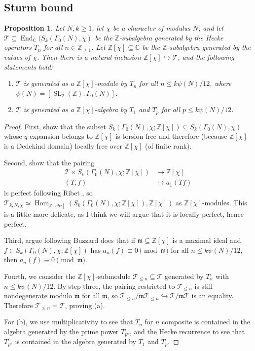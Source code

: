 \documentclass[11pt]{amsart}
\numberwithin{equation}{subsection}
\theoremstyle{plain}
\newtheorem{prop}[equation]{Proposition}
\theoremstyle{definition}
\newcommand{\Z}{\mathbb{Z}}
\newcommand{\C}{\mathbb{C}}
\newcommand{\TT}{\mathcal{T}}
\newcommand{\frakm}{\mathfrak{m}}
\DeclareMathOperator{\End}{End}
\DeclareMathOperator{\SL}{SL}
\DeclareMathOperator{\Hom}{Hom}
\newenvironment{enumalph}
{\begin{enumerate}\renewcommand{\labelenumi}{\textnormal{(\alph{enumi})}}}
{\end{enumerate}}
\begin{document}
\subsection{Sturm bound}

\begin{prop}
Let $N,k \geq 1$, let $\chi$ be a character of modulus $N$, and let $\TT \subseteq \End_\C(S_k(\Gamma_0(N),\chi)$ be the $\Z$-subalgebra generated by the Hecke operators $T_n$ for all $n \in \Z_{\geq 1}$.  Let $\Z[\chi] \subseteq \C$ be the $\Z$-subalgebra generated by the values of $\chi$.  Then there is a natural inclusion $\Z[\chi] \hookrightarrow \TT$, and the following statements hold:
\begin{enumalph}
\item $\TT$ is generated as a $\Z[\chi]$-module by $T_n$ for all $n \leq k\psi(N)/12$, where $\psi(N)=[\SL_2(\Z):\Gamma_0(N)]$.
\item $\TT$ is generated as a $\Z[\chi]$-algebra by $T_1$ and $T_p$ for all $p \leq k\psi(N)/12$.
\end{enumalph}
\end{prop}

\begin{proof}
First, show that the subset $S_k(\Gamma_0(N),\chi;\Z[\chi]) \subseteq S_k(\Gamma_0(N),\chi)$ whose $q$-expansion belongs to $\Z[\chi]$ is torsion free and therefore (because $\Z[\chi]$ is a Dedekind domain) locally free over $\Z[\chi]$ (of finite rank).  

Second, show that the pairing
\begin{equation}
\begin{aligned} 
\TT \times S_k(\Gamma_0(N),\chi;\Z[\chi]) &\to \Z[\chi] \\
(T,f) &\mapsto a_1(Tf)
\end{aligned}
\end{equation}
is perfect following Ribet \cite[Theorem (2.2)]{Ribet:modp}, so $\TT_{k,N,\chi} \simeq \Hom_{\Z[chi]}(S_k(\Gamma_0(N),\chi;\Z[\chi]),\Z[\chi])$ as $\Z[\chi]$-modules.  This is a little more delicate, as I think we will argue that it is locally perfect, hence perfect.  

Third, argue following Buzzard does that if $\frakm \subseteq \Z[\chi]$ is a maximal ideal and $f \in S_k(\Gamma_0(N),\chi;\Z[\chi])$ has $a_n(f) \equiv 0 \pmod{\frakm}$ for all $n \leq k\psi(N)/12$, then $a_n(f) \equiv 0 \pmod{\frakm}$.  

Fourth, we consider the $\Z[\chi]$-submodule $\TT_{\leq n} \subseteq \TT$ generated by $T_n$ with $n \leq k\psi(N)/12$.  By step three, the pairing restricted to $\TT_{\leq n}$ is still nondegenerate modulo $\frakm$ for all $\frakm$, so $\TT_{\leq n}/\frakm \TT_{\leq n} \hookrightarrow \TT/\frakm \TT$ is an equality.  Therefore $\TT_{\leq n}=\TT$, proving (a).

For (b), we use multiplicativity to see that $T_n$ for $n$ composite is contained in the algebra generated by the prime power $T_{p^e}$, and the Hecke recurrence to see that $T_{p^e}$ is contained in the algebra generated by $T_1$ and $T_p$.
\end{proof}
\end{document}
